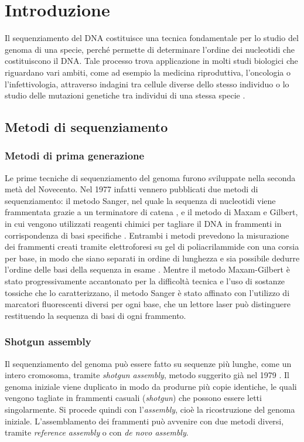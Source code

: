 \documentclass[crop=false, class=book]{standalone}
\begin{document}
	\chapter{Introduzione}
	
	Il sequenziamento del DNA costituisce una tecnica fondamentale per lo studio del genoma di una specie, perché permette di determinare l'ordine dei nucleotidi che costituiscono il DNA. Tale processo trova applicazione in molti studi biologici che riguardano vari ambiti, come ad esempio la medicina riproduttiva, l'oncologia o l'infettivologia, attraverso indagini tra cellule diverse dello stesso individuo o lo studio delle mutazioni genetiche tra individui di una stessa specie \cite{shendure2012expanding}. 

	\section{Metodi di sequenziamento}
		
		\subsection{Metodi di prima generazione}
		Le prime tecniche di sequenziamento del genoma furono sviluppate nella seconda metà del Novecento. Nel 1977 infatti vennero pubblicati due metodi di sequenziamento: il metodo Sanger, nel quale la sequenza di nucleotidi viene frammentata grazie a un terminatore di catena \cite{sanger1977DNA,sanger1977nucleotide}, e il metodo di  Maxam e Gilbert, in cui vengono utilizzati reagenti chimici per tagliare il DNA in frammenti in corrispondenza di basi specifiche \cite{maxam1977new}. Entrambi i metodi prevedono la misurazione dei frammenti creati tramite elettroforesi su gel di poliacrilammide con una corsia per base, in modo che siano separati in ordine di lunghezza e sia possibile dedurre l'ordine delle basi della sequenza in esame \cite{shendure2017DNA}. Mentre il metodo Maxam-Gilbert è stato progressivamente accantonato per la difficoltà tecnica e l'uso di sostanze tossiche che lo caratterizzano, il metodo Sanger è stato affinato con l'utilizzo di marcatori fluorescenti diversi per ogni base, che un lettore laser può distinguere restituendo la sequenza di basi di ogni frammento.
		
		\subsection{Shotgun assembly}
		Il sequenziamento del genoma può essere fatto su sequenze più lunghe, come un intero cromosoma, tramite \textit{shotgun assembly}, metodo suggerito già nel 1979 \cite{staden1979strategy}. Il genoma iniziale viene duplicato in modo da produrne più copie identiche, le quali vengono tagliate in frammenti casuali (\textit{shotgun}) che possono essere letti singolarmente. Si procede quindi con l'\textit{assembly}, cioè la ricostruzione del genoma iniziale. L'assemblamento dei frammenti può avvenire con due metodi diversi, tramite \textit{reference assembly} o con \textit{de novo assembly}.
\end{document}
